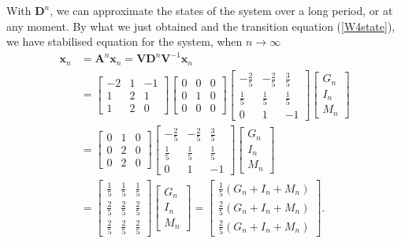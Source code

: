 \documentclass[12pt,a4paper]{article}
\begin{document}
\begin{solution}
    With $\mathbf{D}^n$, we can approximate the states of the system over a long period, or at any moment. By what we just obtained and the transition equation (\ref{W4state}), we have stabilised equation for the system, when $n\to \infty$
    \begin{align*}
    \mathbf{x}_n &= \mathbf{A}^n \mathbf{x}_n = \mathbf{V} \mathbf{D}^n \mathbf{V}^{-1} \mathbf{x}_n \\
    &=\left[\begin{array}{ccc}
-2 & 1 & -1 \\
1 & 2 & 1 \\
1 & 2 & 0
\end{array}\right]
\left[\begin{array}{ccc}
0 & 0 & 0 \\
0 & 1 & 0 \\
0 & 0 & 0
\end{array}\right]\left[\begin{array}{ccc}
-\frac{2}{5} & -\frac{2}{5} & \frac{3}{5} \\
\frac{1}{5} & \frac{1}{5} & \frac{1}{5} \\
0 & 1 & -1
\end{array}\right]
\begin{bmatrix}
    G_n\\I_n\\M_n
\end{bmatrix}  \\
&=\left[\begin{array}{ccc}
0 & 1 & 0 \\
0 & 2 & 0 \\
0 & 2 & 0
\end{array}\right]\left[\begin{array}{ccc}
-\frac{2}{5} & -\frac{2}{5} & \frac{3}{5} \\
\frac{1}{5} & \frac{1}{5} & \frac{1}{5} \\
0 & 1 & -1
\end{array}\right]
\begin{bmatrix}
    G_n\\I_n\\M_n
\end{bmatrix} \\
&=\begin{bmatrix}
\frac{1}{5} & \frac{1}{5} & \frac{1}{5} \\
\frac{2}{5} & \frac{2}{5} & \frac{2}{5} \\
\frac{2}{5} & \frac{2}{5} & \frac{2}{5}
\end{bmatrix}
\begin{bmatrix}
    G_n\\I_n\\M_n
\end{bmatrix}
=
\begin{bmatrix}
    \frac{1}{5}(G_n+I_n+M_n)\\\frac{2}{5}(G_n+I_n+M_n)\\\frac{2}{5}(G_n+I_n+M_n)
\end{bmatrix}.
    \end{align*}


\end{solution}
\end{document}
